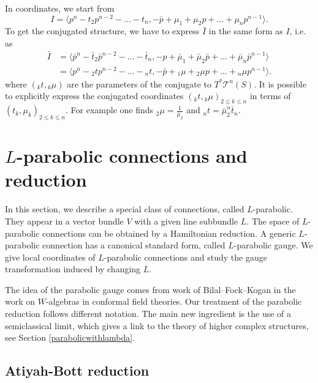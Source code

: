 \documentclass[11pt]{amsart}
\numberwithin{thm}{section} %
\numberwithin{equation}{section} %
\numberwithin{figure}{section} %
\newcommand*{\mc}{\mathcal}
\newcommand*{\cotang}{T^*\mc{T}^n(S)}
\begin{document}
In coordinates, we start from $$I=\langle p^n-t_2p^{n-2}-...-t_n, -\bar{p}+\mu_1+\mu_2p+...+\mu_np^{n-1} \rangle.$$
To get the conjugated structure, we have to express $\bar{I}$ in the same form as $I$, i.e. as 
\begin{align*}
\bar{I} &=\langle \bar{p}^n-\bar{t}_2\bar{p}^{n-2}-...-\bar{t}_n, -p+\bar{\mu}_1+\bar{\mu}_2\bar{p}+...+\bar{\mu}_n\bar{p}^{n-1} \rangle \\
&= \langle p^n-{}_2tp^{n-2}-...-{}_nt, -\bar{p}+{}_1\mu+{}_2\mu p+...+{}_n\mu p^{n-1} \rangle.
\end{align*}
where $({}_kt, {}_k\mu)$ are the parameters of the conjugate to $\cotang$.
It is possible to explicitly express the conjugated coordinates $({}_kt, {}_k\mu)_{2\leq k\leq n}$ in terms of $(t_k, \mu_k)_{2\leq k\leq n}$.
For example one finds ${}_2\mu=\frac{1}{\bar{\mu}_2}$ and ${}_nt = \bar{\mu}_2^n\bar{t}_n$.





\section{$L$-parabolic connections and reduction}\label{parabolicreduction}

In this section, we describe a special class of connections, called $L$-parabolic. They appear in a vector bundle $V$ with a given line subbundle $L$. The space of $L$-parabolic connections can be obtained by a Hamiltonian reduction. A generic $L$-parabolic connection has a canonical standard form, called $L$-parabolic gauge. We give local coordinates of $L$-parabolic connections and study the gauge transformation induced by changing $L$. 

The idea of the parabolic gauge comes from work of Bilal--Fock--Kogan \cite{BFK} in the work on $W$-algebras in conformal field theories.
Our treatment of the parabolic reduction follows different notation. The main new ingredient is the use of a semiclassical limit, which gives a link to the theory of higher complex structures, see Section \ref{parabolicwithlambda}.


\subsection{Atiyah-Bott reduction}
\end{document}
